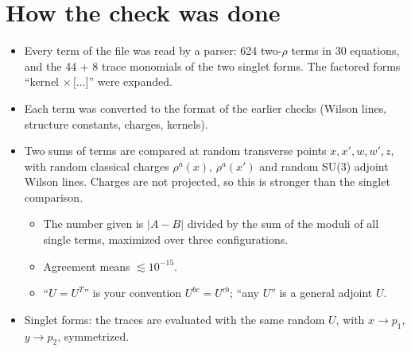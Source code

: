 \documentclass[10pt]{article}
\numberwithin{equation}{section}
\begin{document}
\section{How the check was done}
\begin{itemize}
\item Every term of the file was read by a parser: 624 two-$\rho$ terms in 30 equations, and the 44 + 8 trace monomials of the two singlet forms. The factored forms ``kernel $\times\,\big[\dots\big]$'' were expanded.
\item Each term was converted to the format of the earlier checks (Wilson lines, structure constants, charges, kernels).
\item Two sums of terms are compared at random transverse points $x, x', w, w', z$, with random classical charges $\rho^a(x)$, $\rho^a(x')$ and random SU(3) adjoint Wilson lines. Charges are not projected, so this is stronger than the singlet comparison.
\begin{itemize}
\item The number given is $|A-B|$ divided by the sum of the moduli of all single terms, maximized over three configurations.
\item Agreement means $\lesssim10^{-15}$.
\item ``$U=U^T$'' is your convention $U^{bc}=U^{cb}$; ``any $U$'' is a general adjoint $U$.
\end{itemize}
\item Singlet forms: the traces are evaluated with the same random $U$, with $x\to p_1$, $y\to p_2$, symmetrized.
\end{itemize}

\end{document}
